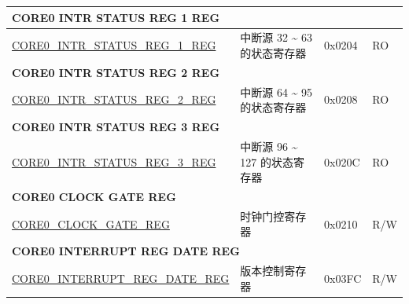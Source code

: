 \begin{longtable}{ | p{8.7cm} | p{6.2cm} | p{1.3cm} | p{1cm} | }
\multicolumn{4}{|l|}{\textbf{CORE0 INTR STATUS REG 1 REG}} \\ \hline
\hyperref[regdesc:CORE0INTRSTATUSREG1REG]{CORE0\_INTR\_STATUS\_REG\_1\_REG} & 中断源 32 \~{} 63 的状态寄存器 & 0x0204 & RO \\ \hline
\multicolumn{4}{|l|}{\textbf{CORE0 INTR STATUS REG 2 REG}} \\ \hline
\hyperref[regdesc:CORE0INTRSTATUSREG2REG]{CORE0\_INTR\_STATUS\_REG\_2\_REG} & 中断源 64 \~{} 95 的状态寄存器 & 0x0208 & RO \\ \hline
\multicolumn{4}{|l|}{\textbf{CORE0 INTR STATUS REG 3 REG}} \\ \hline
\hyperref[regdesc:CORE0INTRSTATUSREG3REG]{CORE0\_INTR\_STATUS\_REG\_3\_REG} & 中断源 96 \~{} 127 的状态寄存器 & 0x020C & RO \\ \hline
\multicolumn{4}{|l|}{\textbf{CORE0 CLOCK GATE REG}} \\ \hline
\hyperref[regdesc:CORE0CLOCKGATEREG]{CORE0\_CLOCK\_GATE\_REG} & 时钟门控寄存器 & 0x0210 & R/W \\ \hline
\multicolumn{4}{|l|}{\textbf{CORE0 INTERRUPT REG DATE REG}} \\ \hline
\hyperref[regdesc:CORE0INTERRUPTREGDATEREG]{CORE0\_INTERRUPT\_REG\_DATE\_REG} & 版本控制寄存器 & 0x03FC & R/W \\ \hline
\end{longtable}
